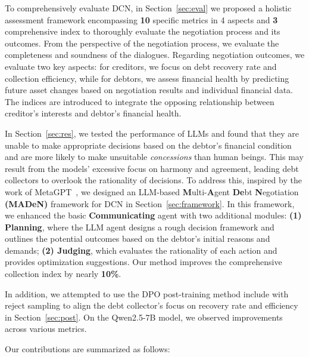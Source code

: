 To comprehensively evaluate DCN, in Section~\ref{sec:eval} we proposed a holistic assessment framework encompassing \textbf{10} specific metrics in 4 aspects and \textbf{3} comprehensive index to thoroughly evaluate the negotiation process and its outcomes. From the perspective of the negotiation process, we evaluate the completeness and soundness of the dialogues. Regarding negotiation outcomes, we evaluate two key aspects: for creditors, we focus on debt recovery rate and collection efficiency, while for debtors, we assess financial health by predicting future asset changes based on negotiation results and individual financial data. The indices are introduced to integrate the opposing relationship between creditor’s interests and debtor's financial health.

In Section~\ref{sec:res}, we tested the performance of LLMs and found that they are unable to make appropriate decisions based on the debtor’s financial condition and are more likely to make unsuitable \textit{concessions} than human beings. This may result from the models’ excessive focus on harmony and agreement, leading debt collectors to overlook the rationality of decisions. To address this, inspired by the work of MetaGPT~\citep{Hong2023MetaGPTMP}, we designed an LLM-based \textbf{M}ulti-\textbf{A}gent \textbf{De}bt \textbf{N}egotiation \textbf{(MADeN)} framework for DCN in Section~\ref{sec:framework}. In this framework, we enhanced the basic \textbf{Communicating} agent with two additional modules: \textbf{(1) Planning}, where the LLM agent designs a rough decision framework and outlines the potential outcomes based on the debtor’s initial reasons and demands; \textbf{(2) Judging}, which evaluates the rationality of each action and provides optimization suggestions. Our method improves the comprehensive collection index by nearly \textbf{10\%}.
 
In addition, we attempted to use the DPO post-training method include \citep{rafailov2024directpreferenceoptimizationlanguage} with reject sampling \citep{liu2024statisticalrejectionsamplingimproves} to align the debt collector’s focus on recovery rate and efficiency in Section~\ref{sec:post}. On the Qwen2.5-7B \citep{qwen2.5} model, we observed improvements across various metrics.

Our contributions are summarized as follows:

